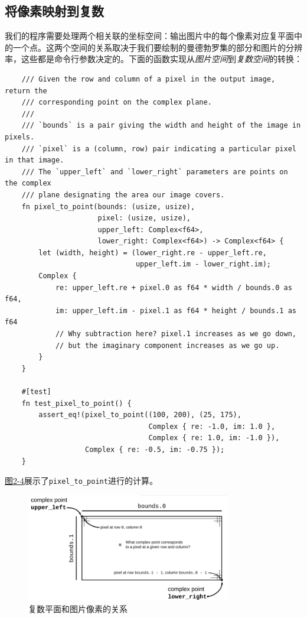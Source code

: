 \subsection{将像素映射到复数}
我们的程序需要处理两个相关联的坐标空间：输出图片中的每个像素对应复平面中的一个点。这两个空间的关系取决于我们要绘制的曼德勃罗集的部分和图片的分辨率，这些都是命令行参数决定的。下面的函数实现从\emph{图片空间}到\emph{复数空间}的转换：
\begin{verbatim}
    /// Given the row and column of a pixel in the output image, return the
    /// corresponding point on the complex plane.
    ///
    /// `bounds` is a pair giving the width and height of the image in pixels.
    /// `pixel` is a (column, row) pair indicating a particular pixel in that image.
    /// The `upper_left` and `lower_right` parameters are points on the complex
    /// plane designating the area our image covers.
    fn pixel_to_point(bounds: (usize, usize),
                      pixel: (usize, usize),
                      upper_left: Complex<f64>,
                      lower_right: Complex<f64>) -> Complex<f64> {
        let (width, height) = (lower_right.re - upper_left.re,
                               upper_left.im - lower_right.im);
        Complex {
            re: upper_left.re + pixel.0 as f64 * width / bounds.0 as f64,
            im: upper_left.im - pixel.1 as f64 * height / bounds.1 as f64
            // Why subtraction here? pixel.1 increases as we go down,
            // but the imaginary component increases as we go up.
        }
    }

    #[test]
    fn test_pixel_to_point() {
        assert_eq!(pixel_to_point((100, 200), (25, 175),
                                  Complex { re: -1.0, im: 1.0 },
                                  Complex { re: 1.0, im: -1.0 }),
                   Complex { re: -0.5, im: -0.75 });
    }
\end{verbatim}

\hyperref[f2-4]{图2-4}展示了\texttt{pixel\_to\_point}进行的计算。

\begin{figure}[htbp]
    \centering
    \includegraphics[width=0.8\textwidth]{../img/f2-4.png}
    \caption{复数平面和图片像素的关系}
    \label{f2-4}
\end{figure}


